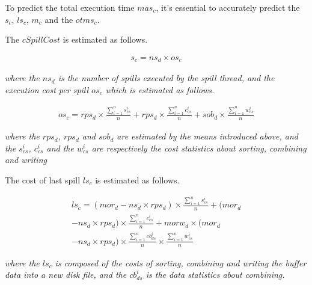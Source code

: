 To predict the total execution time $mas_c$, it's essential to accurately predict the $s_c$, $ls_c$, $m_c$ and the $otms_c$.

The $cSpillCost$ is estimated as follows.
\begin{small}
\begin{equation}
\begin{split}
s_c=ns_d\times os_c
\end{split}
\end{equation}
\end{small}
\emph{where the $ns_d$ is the number of spills executed by the spill thread, and the execution cost per spill $os_c$ which is estimated as follows.}
\begin{small}
\begin{equation}
\begin{split}
os_c=rps_d\times\frac{\sum_{i=1}^ns_{cs}^i}{n}+rps_d\times\frac{\sum_{i=1}^nc_{cs}^i}{n}+sob_d\times \frac{\sum_{i=1}^nw_{cs}^i}{n}\nonumber
\end{split}
\end{equation}
\end{small}
\emph{where the $rps_d$, $rps_d$ and $sob_d$ are estimated by the means introduced above, and the $s_{cs}^i$, $c_{cs}^i$ and the $w_{cs}^i$ are respectively the cost statistics about sorting, combining and writing}

The cost of last spill $ls_c$ is estimated as follows.
\begin{small}
\begin{equation}
\begin{split}
ls_c=(mor_d-ns_d\times rps_d)\times \frac{\sum_{i=1}^ns_{cs}^i}{n}+(mor_d\\
-ns_d\times rps_d)\times \frac{\sum_{i=1}^nc_{cs}^i}{n}+morw_d\times  (mor_d\\
-ns_d\times rps_d)\times \frac{\sum_{i=1}^ncb_{ds}^i}{n}\times \frac{\sum_{i=1}^nw_{cs}^i}{n}
\end{split}
\end{equation}
\end{small}
\emph{where the $ls_c$ is composed of the costs of sorting, combining and writing the buffer data into a new disk file, and the $cb_{ds}^i$ is the data statistics about combining. }

